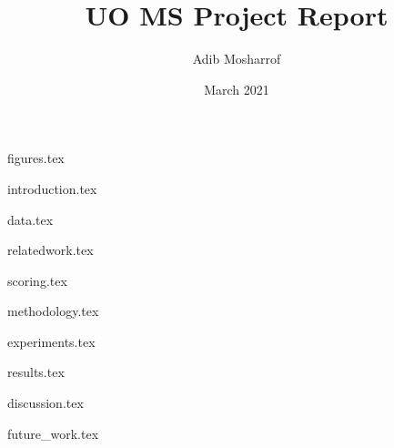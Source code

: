 \documentclass{article}
\title{UO MS Project Report}
\author{Adib Mosharrof}
\date{March 2021}
\begin{document}
\maketitle

\tableofcontents
\newpage

{figures.tex}

{introduction.tex}

{data.tex}

{relatedwork.tex}

{scoring.tex}

{methodology.tex}

{experiments.tex}

{results.tex}

{discussion.tex}

{future_work.tex}



\end{document}

